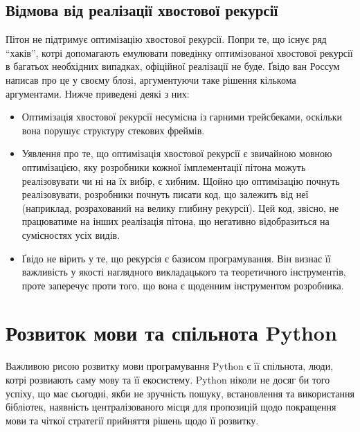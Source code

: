 \documentclass[a4paper, 12pt, onsedie]{article}
\begin{document}
\subsection{Відмова від реалізації хвостової рекурсії}
    Пітон не підтримує оптимізацію хвостової рекурсії. Попри те, що існує ряд ``хаків'', котрі
    допомагають емулювати поведінку оптимізованої хвостової рекурсії в багатьох необхідних
    випадках, офіційної реалізації не буде. Ґвідо ван Россум написав про це у своєму блозі,
    аргументуючи таке рішення кількома аргументами. Нижче приведені деякі з них:
     \begin{itemize}
        \item Оптимізація хвостової рекурсії несумісна із гарними трейсбеками, оскільки вона
        порушує структуру стекових фреймів.
        \item Уявлення про те, що оптимізація хвостової рекурсії є звичайною мовною 
        оптимізацією, яку розробники кожної імплементації пітона можуть реалізовувати чи ні на 
        їх вибір, є хибним. Щойно цю оптимізацію почнуть реалізовувати, розробники почнуть 
        писати код, що залежить від неї (наприклад, розрахований на велику глибину рекурсії). 
        Цей код, звісно, не працюватиме на інших реалізація пітона, що негативно відобразиться 
        на сумісностях усіх видів.
        \item Ґвідо не вірить у те, що рекурсія є базисом програмування. Він визнає її 
        важливість у якості наглядного викладацького та теоретичного інструментів, проте 
        заперечує проти того, що вона є щоденним інструментом розробника.
     \end{itemize}


\section{Розвиток мови та спільнота Python}
    Важливою рисою розвитку мови програмування Python є її спільнота, люди, котрі розвиають саму
    мову та її екосистему. Python ніколи не досяг би того успіху, що має сьогодні, якби не
    зручність пошуку, встановлення та використання бібліотек, наявність централізованого
    місця для пропозицій щодо покращення мови та чіткої стратегії прийняття рішень щодо її
    розвитку. 
\end{document}
